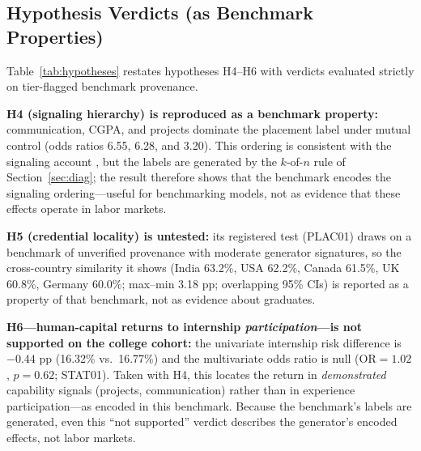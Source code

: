 \documentclass[journal]{IEEEtran}
\begin{document}
\subsection{Hypothesis Verdicts (as Benchmark Properties)}

Table~\ref{tab:hypotheses} restates hypotheses H4--H6 with verdicts evaluated strictly on tier-flagged benchmark provenance.

\begin{table}[!htbp]
\centering
\caption{Hypotheses H4--H6 and Verdicts (benchmark-audit framing)}
\label{tab:hypotheses}
\end{table}

\textbf{H4 (signaling hierarchy) is reproduced as a benchmark property:} communication, CGPA, and projects dominate the placement label under mutual control (odds ratios 6.55, 6.28, and 3.20). This ordering is consistent with the signaling account \cite{spence1973job}, but the labels are generated by the $k$-of-$n$ rule of Section~\ref{sec:diag}; the result therefore shows that the benchmark encodes the signaling ordering---useful for benchmarking models, not as evidence that these effects operate in labor markets.

\textbf{H5 (credential locality) is untested:} its registered test (PLAC01) draws on a benchmark of unverified provenance with moderate generator signatures, so the cross-country similarity it shows (India 63.2\%, USA 62.2\%, Canada 61.5\%, UK 60.8\%, Germany 60.0\%; max--min 3.18 pp; overlapping 95\% CIs) is reported as a property of that benchmark, not as evidence about graduates.

\textbf{H6---human-capital returns to internship \textit{participation}---is not supported on the college cohort:} the univariate internship risk difference is $-0.44$ pp (16.32\% vs.\ 16.77\%) and the multivariate odds ratio is null ($\text{OR} = 1.02$, $p = 0.62$; STAT01). Taken with H4, this locates the return in \textit{demonstrated} capability signals (projects, communication) rather than in experience participation---as encoded in this benchmark. Because the benchmark's labels are generated, even this ``not supported'' verdict describes the generator's encoded effects, not labor markets.
\end{document}
